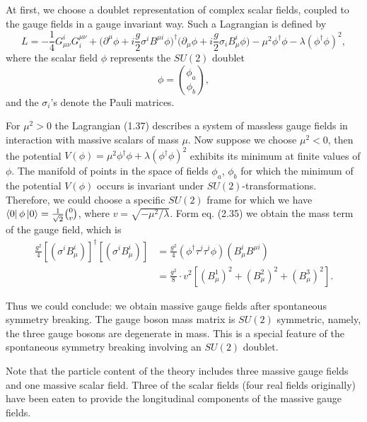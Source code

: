 At first, we choose a doublet representation of complex scalar fields, coupled to the gauge fields in a gauge invariant way. Such a Lagrangian is defined by
\begin{equation}
L=-\frac{1}{4}G^i_{\mu\nu}G_i^{\mu\nu}+\Big(\partial^\mu\phi+i\frac{g}{2}\sigma^iB^{\mu i}\phi\Big)^{\dagger}
\Big(\partial_\mu\phi+i\frac{g}{2}\sigma_i B_{\mu}^i\phi\Big)-\mu^2\phi^{\dagger}\phi-\lambda(\phi^{\dagger}\phi)^2,
\end{equation}
where the scalar field $\phi$ represents the $SU(2)$ doublet
\begin{equation}
\phi=\binom{\phi_a}{\phi_b},
\end{equation}
and the $\sigma_i$'s denote the Pauli matrices.

For $\mu^2>0$ the Lagrangian (1.37) describes a system of massless gauge fields in interaction with massive scalars of mass $\mu$. Now suppose we choose $\mu^2<0$, then  the potential $V(\phi)=\mu^2\phi^\dagger\phi+\lambda(\phi^\dagger\phi)^2$ exhibits its minimum at finite values of $\phi$. The manifold of points in the space of fields $\phi_a$, $\phi_b$ for which the minimum of the potential $V(\phi)$ occurs is invariant under $SU(2)$-transformations. Therefore, we could choose a specific $SU(2)$ frame for which we have $\bra{0}\phi\ket{0}=\frac{1}{\sqrt{2}}\binom{0}{v}$, where $v=\sqrt{-\mu^2/\lambda}$. Form eq. (2.35) we obtain the mass term of the gauge field, which is
\begin{align}
\frac{g^2}{4}[(\sigma^i B^i_\mu)]^{\dagger}[(\sigma^i B^i_\mu)]&=\frac{g^2}{4}(\phi^\dagger\tau^j\tau^i\phi)(B_\mu^i B^{\mu i})\nonumber\\
&=\frac{g^2}{8}\cdot v^2[(B^1_\mu)^2+(B^2_\mu)^2+(B^3_\mu)^2].
\end{align}

Thus we could conclude: we obtain massive gauge fields after spontaneous symmetry breaking. The gauge boson mass matrix is $SU(2)$ symmetric, namely, the three gauge bosons are degenerate in mass. This is a special feature of the spontaneous symmetry breaking involving an $SU(2)$ doublet.

Note that the particle content of the theory includes three massive gauge fields and one massive scalar field. Three of the scalar fields (four real fields originally) have been eaten to provide the longitudinal components of the massive gauge fields. 

